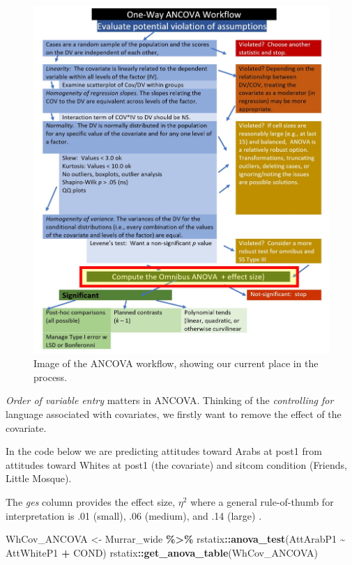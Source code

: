 \documentclass[
  11pt,
]{book}
\newenvironment{Shaded}{\begin{snugshade}}{\end{snugshade}}
\newcommand{\FunctionTok}[1]{\textcolor[rgb]{0.27,0.27,0.27}{\textbf{#1}}}
\newcommand{\NormalTok}[1]{#1}
\newcommand{\OtherTok}[1]{\textcolor[rgb]{0.37,0.37,0.37}{#1}}
\newcommand{\SpecialCharTok}[1]{\textcolor[rgb]{0.43,0.43,0.43}{\textbf{#1}}}
\begin{document}
\begin{figure}
\centering
\includegraphics{images/ANCOVA/wf_ANCOVA_omnibus.jpg}
\caption{Image of the ANCOVA workflow, showing our current place in the process.}
\end{figure}

\emph{Order of variable entry} matters in ANCOVA. Thinking of the \emph{controlling for} language associated with covariates, we firstly want to remove the effect of the covariate.

In the code below we are predicting attitudes toward Arabs at post1 from attitudes toward Whites at post1 (the covariate) and sitcom condition (Friends, Little Mosque).

The \emph{ges} column provides the effect size, \(\eta^2\) where a general rule-of-thumb for interpretation is .01 (small), .06 (medium), and .14 (large) \citep{lakens_calculating_2013}.

\begin{Shaded}
\begin{Highlighting}[]
\NormalTok{WhCov\_ANCOVA }\OtherTok{\textless{}{-}}\NormalTok{ Murrar\_wide }\SpecialCharTok{\%\textgreater{}\%}
\NormalTok{    rstatix}\SpecialCharTok{::}\FunctionTok{anova\_test}\NormalTok{(AttArabP1 }\SpecialCharTok{\textasciitilde{}}\NormalTok{ AttWhiteP1 }\SpecialCharTok{+}\NormalTok{ COND)}
\NormalTok{rstatix}\SpecialCharTok{::}\FunctionTok{get\_anova\_table}\NormalTok{(WhCov\_ANCOVA)}
\end{Highlighting}
\end{Shaded}
\end{document}
